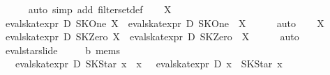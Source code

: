 \begin{isabellebody}
\ \ \ \ \isamarkupfalse%
\ {}auto\ simp\ add{}\ filter{}set{}def{}\isanewline
{}\isamarkupfalse%
\isanewline
\ \ \isamarkupfalse%
\ X\isanewline
\ \ \isamarkupfalse%
\ {}eval{}skat{}expr\ D\ SKOne\ {}{}X{}\ {}\ {}eval{}skat{}expr\ D\ SKOne\ {}\ X{}\isanewline
\ \ \ \ \isamarkupfalse%
\ auto\isanewline
{}\isamarkupfalse%
\isanewline
\ \ \isamarkupfalse%
\ X\isanewline
\ \ \isamarkupfalse%
\ {}eval{}skat{}expr\ D\ SKZero\ {}{}X{}\ {}\ {}eval{}skat{}expr\ D\ SKZero\ {}\ X{}\isanewline
\ \ \ \ \isamarkupfalse%
\ auto\isanewline
{}\isamarkupfalse%
%
\endisatagproof
{\isafoldproof}%
%
\isadelimproof
\isanewline
%
\endisadelimproof
\isanewline
{}\isamarkupfalse%
\ eval{}star{}slide{}\isanewline
\ \ \ {}\ {}{}\ {}{}b\ mems{}\isanewline
\ \ \ {}eval{}skat{}expr\ D\ {}SKStar\ x\ {}{}{}\ x{}\ {}\ {}\ eval{}skat{}expr\ D\ {}x\ {}{}{}\ SKStar\ x{}\ {}{}\isanewline

\end{isabellebody}
